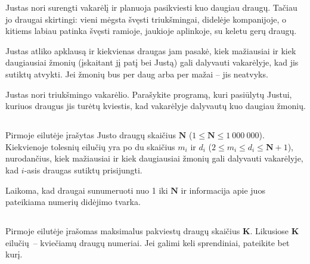 \documentclass{liostyle}
\begin{document}
Justas nori surengti vakarėlį ir planuoja pasikviesti kuo 
daugiau draugų. Tačiau jo draugai skirtingi: vieni mėgsta 
švęsti triukšmingai, didelėje kompanijoje, o kitiems labiau 
patinka švęsti ramioje, jaukioje aplinkoje, su keletu gerų 
draugų.

Justas atliko apklausą ir kiekvienas draugas jam pasakė, kiek 
mažiausiai ir kiek daugiausiai žmonių (įskaitant jį patį bei 
Justą) gali dalyvauti vakarėlyje, kad jis sutiktų atvykti. Jei
žmonių bus per daug arba per mažai – jis neatvyks.

Justas nori triukšmingo vakarėlio. Parašykite programą, kuri pasiūlytų 
Justui, kuriuos draugus jis turėtų kviestis, kad vakarėlyje dalyvautų kuo daugiau 
žmonių.

\subsection*{\Input}

Pirmoje eilutėje įrašytas Justo draugų skaičius $\mathbf{N}$
($1 \le \mathbf{N} \le 1\ 000\ 000$). Kiekvienoje tolesnių eilučių yra po du skaičius
$m_i$ ir $d_i$ ($2\le m_i\le d_i\le \mathbf{N}+1$), nurodančius, kiek
mažiausiai ir kiek daugiausiai žmonių gali dalyvauti vakarėlyje, kad $i$-asis
draugas sutiktų prisijungti.

Laikoma, kad draugai sunumeruoti nuo 1 iki $\mathbf{N}$ ir informacija apie
juos pateikiama numerių didėjimo tvarka.

\subsection*{\Output}

Pirmoje eilutėje įrašomas maksimalus pakviestų draugų skaičius $\mathbf{K}$.
Likusiose $\mathbf{K}$ eilučių~-- kviečiamų draugų numeriai. Jei galimi keli sprendiniai,
pateikite bet kurį.
\end{document}
